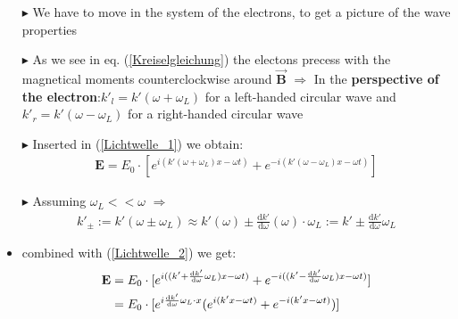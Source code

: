\documentclass[11pt,a4paper]{beamer}
\begin{document}
\begin{frame}
\begin{itemize}
\item[$\blacktriangleright$] We have to move in the system of the electrons, to get a picture of the wave properties
\item[$\blacktriangleright$] As we see in eq. (\ref{Kreiselgleichung}) the electons precess with the magnetical moments counterclockwise around $\vec{\textbf{B}}$\newline\newline
$\Rightarrow$ In the \textbf{perspective of the electron}:\newline $k'_l = k'(\omega + \omega_L)$ for a left-handed circular wave and $k'_r = k'(\omega - \omega_L)$ for a right-handed circular wave
\item[$\blacktriangleright$] Inserted in (\ref{Lichtwelle_1}) we obtain:
\begin{align}
\textbf{E} = E_0\cdot[e^{i(k'(\omega + \omega_L) x - \omega t)}+e^{-i(k'(\omega - \omega_L) x - \omega t)}]
\label{Lichtwelle_2}
\end{align}
\end{itemize}
\end{frame}
\begin{frame}
\begin{itemize}
\item[$\blacktriangleright$] Assuming $\omega_L << \omega$ $\Rightarrow$
\begin{align*}
k'_{\pm} := k'(\omega \pm \omega_L) \approx k'(\omega) \pm \frac{\text{d} k'}{\text{d} \omega}(\omega)\cdot\omega_L := k' \pm \frac{\text{d}k'}{\text{d}\omega}\omega_L
\end{align*}
\item combined with (\ref{Lichtwelle_2}) we get:
\begin{align}
\textbf{E}& = E_0\cdot[e^{i((k'+ \frac{\text{d} k'}{\text{d} \omega}\omega_L) x - \omega t)}+e^{-i((k' - \frac{\text{d} k'}{\text{d} \omega}\omega_L) x - \omega t)}] \notag \\
& = E_0\cdot[e^{i\frac{\text{d} k'}{\text{d} \omega}\omega_L \cdot x}(e^{i(k' x - \omega t)}+e^{-i(k' x - \omega t)})]
\label{Lichtwelle_3}
\end{align}
\end{itemize}
\end{frame}
\end{document}
